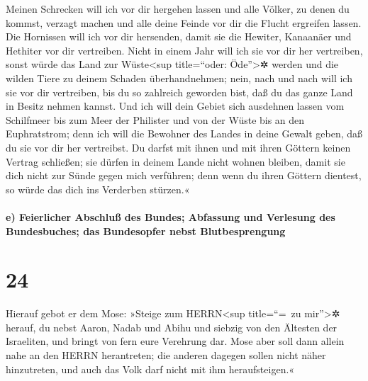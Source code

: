  Meinen Schrecken will ich vor dir hergehen lassen und
alle Völker, zu denen du kommst, verzagt machen und alle deine Feinde
vor dir die Flucht ergreifen lassen.  Die Hornissen will
ich vor dir hersenden, damit sie die Hewiter, Kanaanäer und Hethiter vor
dir vertreiben.  Nicht in einem Jahr will ich sie vor dir
her vertreiben, sonst würde das Land zur Wüste\textless sup
title=``oder: Öde''\textgreater✲ werden und die wilden Tiere zu deinem
Schaden überhandnehmen;  nein, nach und nach will ich sie
vor dir vertreiben, bis du so zahlreich geworden bist, daß du das ganze
Land in Besitz nehmen kannst.  Und ich will dein Gebiet
sich ausdehnen lassen vom Schilfmeer bis zum Meer der Philister und von
der Wüste bis an den Euphratstrom; denn ich will die Bewohner des Landes
in deine Gewalt geben, daß du sie vor dir her vertreibst.
 Du darfst mit ihnen und mit ihren Göttern keinen Vertrag
schließen;  sie dürfen in deinem Lande nicht wohnen
bleiben, damit sie dich nicht zur Sünde gegen mich verführen; denn wenn
du ihren Göttern dientest, so würde das dich ins Verderben stürzen.«

\hypertarget{e-feierlicher-abschluuxdf-des-bundes-abfassung-und-verlesung-des-bundesbuches-das-bundesopfer-nebst-blutbesprengung}{%
\paragraph{e) Feierlicher Abschluß des Bundes; Abfassung und Verlesung
des Bundesbuches; das Bundesopfer nebst
Blutbesprengung}\label{e-feierlicher-abschluuxdf-des-bundes-abfassung-und-verlesung-des-bundesbuches-das-bundesopfer-nebst-blutbesprengung}}

\hypertarget{section-23}{%
\section{24}\label{section-23}}

 Hierauf gebot er dem Mose: »Steige zum HERRN\textless sup
title=``=~zu mir''\textgreater✲ herauf, du nebst Aaron, Nadab und Abihu
und siebzig von den Ältesten der Israeliten, und bringt von fern eure
Verehrung dar.  Mose aber soll dann allein nahe an den
HERRN herantreten; die anderen dagegen sollen nicht näher hinzutreten,
und auch das Volk darf nicht mit ihm heraufsteigen.«

